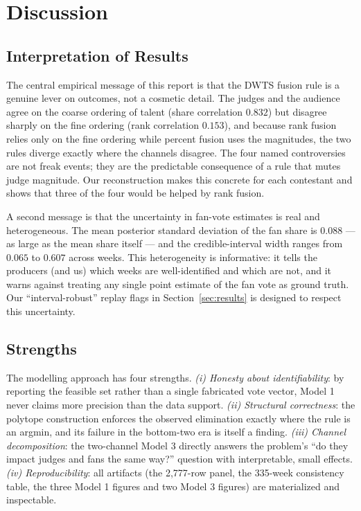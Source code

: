 \documentclass{article}
\begin{document}




\section{Discussion}\label{sec:discussion}

\subsection{Interpretation of Results}

The central empirical message of this report is that the DWTS fusion rule is a genuine
lever on outcomes, not a cosmetic detail. The judges and the audience agree on the coarse
ordering of talent (share correlation $0.832$) but disagree sharply on the fine ordering
(rank correlation $0.153$), and because rank fusion relies only on the fine ordering while
percent fusion uses the magnitudes, the two rules diverge exactly where the channels
disagree. The four named controversies are not freak events; they are the predictable
consequence of a rule that mutes judge magnitude. Our reconstruction makes this concrete for
each contestant and shows that three of the four would be helped by rank fusion.

A second message is that the uncertainty in fan-vote estimates is real and heterogeneous.
The mean posterior standard deviation of the fan share is $0.088$ --- as large as the mean
share itself --- and the credible-interval width ranges from $0.065$ to $0.607$ across weeks.
This heterogeneity is informative: it tells the producers (and us) which weeks are
well-identified and which are not, and it warns against treating any single point estimate
of the fan vote as ground truth. Our ``interval-robust'' replay flags in
Section~\ref{sec:results} is designed to respect this uncertainty.

\subsection{Strengths}

The modelling approach has four strengths. \emph{(i) Honesty about identifiability}: by
reporting the feasible set rather than a single fabricated vote vector, Model 1 never claims
more precision than the data support. \emph{(ii) Structural correctness}: the polytope
construction enforces the observed elimination exactly where the rule is an argmin, and its
failure in the bottom-two era is itself a finding. \emph{(iii) Channel decomposition}: the
two-channel Model 3 directly answers the problem's ``do they impact judges and fans the same
way?'' question with interpretable, small effects. \emph{(iv) Reproducibility}: all
artifacts (the 2{,}777-row panel, the 335-week consistency table, the three Model 1 figures
and two Model 3 figures) are materialized and inspectable.
\end{document}
